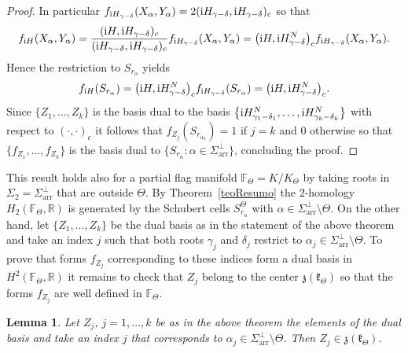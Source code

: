 \documentclass[10pt,a4paper]{amsart}
\numberwithin{equation}{section}
\newtheorem{Lemma}[Theorem]{Lemma}
\begin{document}
\begin{proof}
In particular $f_{{\rm i}H_{\gamma -\delta }} ( X_{\alpha },Y_{\alpha } ) =2 ( {\rm i}H_{\gamma -\delta },{\rm i}H_{\gamma -\delta } ) _{c}$ so that
\begin{gather*}
f_{{\rm i}H}( X_{\alpha },Y_{\alpha }) =\frac{( {\rm i}H,{\rm i}H_{\gamma-\delta }) _{c}}{( {\rm i}H_{\gamma -\delta },{\rm i}H_{\gamma -\delta}) _{c}}f_{{\rm i}H_{\gamma -\delta }}( X_{\alpha },Y_{\alpha })
=\big( {\rm i}H,{\rm i}H_{\gamma -\delta }^{N}\big) _{c}f_{{\rm i}H_{\gamma -\delta}}( X_{\alpha },Y_{\alpha }).
\end{gather*}
Hence the restriction to $S_{r_{\alpha }}$ yields%
\begin{gather*}
f_{{\rm i}H} ( S_{r_{\alpha }} ) =\big( {\rm i}H,{\rm i}H_{\gamma -\delta }^{N}\big) _{c}f_{{\rm i}H_{\gamma -\delta }} ( S_{r_{\alpha }} ) =\big( {\rm i}H,{\rm i}H_{\gamma -\delta }^{N}\big) _{c}.
\end{gather*}
Since $\{Z_{1},\ldots,Z_{k}\}$ is the basis dual to the basis $\big\{{\rm i}H_{\gamma_{1}-\delta _{1}}^{N},\ldots,{\rm i}H_{\gamma _{k}-\delta _{k}}^{N}\big\}$ with respect to $(\cdot,\cdot) _{c}$ it follows that $f_{Z_{j}} ( S_{r_{\alpha _{k}}} ) =1$ if $j=k$ and $0$ otherwise so that $\{f_{Z_{1}},\ldots, f_{Z_{k}}\}$ is the basis dual to $\{S_{r_{\alpha}}\colon \alpha \in \Sigma _{\mathrm{arr}}^{\bot }\}$, concluding the proof.
\end{proof}


This result holds also for a partial flag manifold $\mathbb{F}_{\Theta}=K/K_{\Theta }$ by taking roots in $\Sigma _{2}=\Sigma _{\mathrm{arr}}^{\bot }$ that are outside $\Theta $. By Theorem~\ref{teoResumo} the $2$-homology $H_{2}( \mathbb{F}_{\Theta },\mathbb{R}) $ is generated by the Schubert cells $S_{r_{\alpha }}^{\Theta }$ with $\alpha \in \Sigma _{\mathrm{arr}}^{\bot }\setminus \Theta $. On the other hand, let $\{Z_{1},\ldots,Z_{k}\}$ be the dual basis as in the statement of the above theorem and take an index $j$ such that both roots $\gamma _{j}$ and $\delta _{j}$ restrict to $\alpha _{j}\in \Sigma _{\mathrm{arr}}^{\bot }\setminus \Theta $. To prove that forms $f_{Z_{j}}$ corresponding to these indices form a dual basis in~$H^{2} ( \mathbb{F}_{\Theta },\mathbb{R} ) $ it remains to check that $Z_{j}$ belong to the center $\mathfrak{z}(\mathfrak{k}_{\Theta }) $ so that the forms $f_{Z_{j}}$ are well defined in $\mathbb{F}_{\Theta }$.

\begin{Lemma} Let $Z_{j}$, $j=1,\ldots,k$ be as in the above theorem the elements of the dual basis and take an index $j$ that corresponds to $\alpha _{j}\in \Sigma _{\mathrm{arr}}^{\bot }\setminus \Theta $. Then $Z_{j}\in \mathfrak{z}(\mathfrak{k}_{\Theta }) $.
\end{Lemma}
\end{document}
